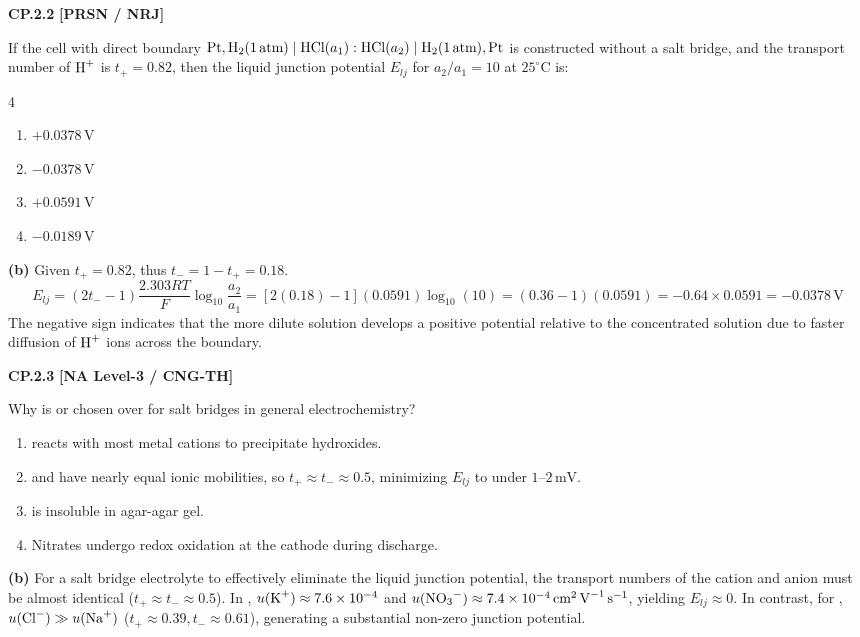 \begin{problembox}
\textbf{CP.2.2} \hfill \textbf{[PRSN / NRJ]}

If the cell with direct boundary $\ce{Pt, H2}(1\,\text{atm}) \mid \ce{HCl}(a_1) : \ce{HCl}(a_2) \mid \ce{H2}(1\,\text{atm}), \ce{Pt}$ is constructed without a salt bridge, and the transport number of $\ce{H+}$ is $t_+ = 0.82$, then the liquid junction potential $E_{lj}$ for $a_2/a_1 = 10$ at $25^\circ\text{C}$ is:
\begin{multicols}{4}
\begin{enumerate}[label=(\alph*)]
    \item $+0.0378\,\text{V}$
    \item $-0.0378\,\text{V}$
    \item $+0.0591\,\text{V}$
    \item $-0.0189\,\text{V}$
\end{enumerate}
\end{multicols}
\end{problembox}
\begin{solution}
\textbf{(b)}
Given $t_+ = 0.82$, thus $t_- = 1 - t_+ = 0.18$.
\begin{equation*}
    E_{lj} = (2t_- - 1)\frac{2.303 RT}{F}\log_{10} \frac{a_2}{a_1} = [2(0.18) - 1](0.0591)\log_{10}(10) = (0.36 - 1)(0.0591) = -0.64 \times 0.0591 = -0.0378\,\text{V}
\end{equation*}
The negative sign indicates that the more dilute solution develops a positive potential relative to the concentrated solution due to faster diffusion of $\ce{H+}$ ions across the boundary.
\end{solution}

\begin{problembox}
\textbf{CP.2.3} \hfill \textbf{[NA Level-3 / CNG-TH]}

Why is  or  chosen over  for salt bridges in general electrochemistry?
\begin{enumerate}[label=(\alph*)]
    \item {} reacts with most metal cations to precipitate hydroxides.
    \item {} and  have nearly equal ionic mobilities, so $t_+ \approx t_- \approx 0.5$, minimizing $E_{lj}$ to under $1\text{--}2\,\text{mV}$.
    \item {} is insoluble in agar-agar gel.
    \item Nitrates undergo redox oxidation at the cathode during discharge.
\end{enumerate}
\end{problembox}
\begin{solution}
\textbf{(b)} For a salt bridge electrolyte to effectively eliminate the liquid junction potential, the transport numbers of the cation and anion must be almost identical ($t_+ \approx t_- \approx 0.5$). In , $u(\ce{K+}) \approx 7.6 \times 10^{-4}$ and $u(\ce{NO3-}) \approx 7.4 \times 10^{-4}\,\text{cm}^2\,\text{V}^{-1}\,\text{s}^{-1}$, yielding $E_{lj} \approx 0$. In contrast, for , $u(\ce{Cl-}) \gg u(\ce{Na+})$ ($t_+ \approx 0.39, t_- \approx 0.61$), generating a substantial non-zero junction potential.
\end{solution}

